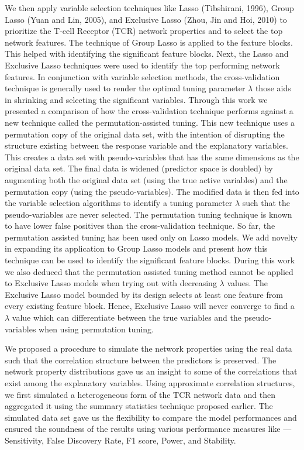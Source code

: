 We then apply variable selection techniques like Lasso (\cite{tibshir}Tibshirani, 1996), Group Lasso (\cite{grouporigin}Yuan and Lin, 2005), and Exclusive Lasso (\cite{exclusv_lasso}Zhou, Jin and Hoi, 2010) to prioritize the T-cell Receptor (TCR) network properties and to select the top network features. The technique of Group Lasso is applied to the feature blocks. This helped with identifying the significant feature blocks. Next, the Lasso and Exclusive Lasso techniques were used to identify the top performing network features. In conjunction with variable selection methods, the cross-validation technique is generally used to render the optimal tuning parameter $\lambda$ those aids in shrinking and selecting the significant variables. Through this work we presented a comparison of how the cross-validation technique performs against a new technique called the permutation-assisted tuning. This new technique uses a permutation copy of the original data set, with the intention of disrupting the structure existing between the response variable and the explanatory variables. This creates a data set with pseudo-variables that has the same dimensions as the original data set. The final data is widened (predictor space is doubled) by augmenting both the original data set (using the true active variables) and the permutation copy (using the pseudo-variables). The modified data is then fed into the variable selection algorithms to identify a tuning parameter $\lambda$ such that the pseudo-variables are never selected. The permutation tuning technique is known to have lower false positives than the cross-validation technique. So far, the permutation assisted tuning has been used only on Lasso models. We add novelty in expanding its application to Group Lasso models and present how this technique can be used to identify the significant feature blocks. During this work we also deduced that the permutation assisted tuning method cannot be applied to Exclusive Lasso models when trying out with decreasing $\lambda$ values. The Exclusive Lasso model bounded by its design selects at least one feature from every existing feature block. Hence, Exclusive Lasso will never converge to find a $\lambda$ value which can differentiate between the true variables and the pseudo-variables when using permutation tuning.\par

We proposed a procedure to simulate the network properties using the real data such that the correlation structure between the predictors is preserved. The network property distributions gave us an insight to some of the correlations that exist among the explanatory variables. Using approximate correlation structures, we first simulated a heterogeneous form of the TCR network data and then aggregated it using the summary statistics technique proposed earlier. The simulated data set gave us the flexibility to compare the model performances and ensured the soundness of the results using various performance measures like --- Sensitivity, False Discovery Rate, F1 score, Power, and Stability.\par

